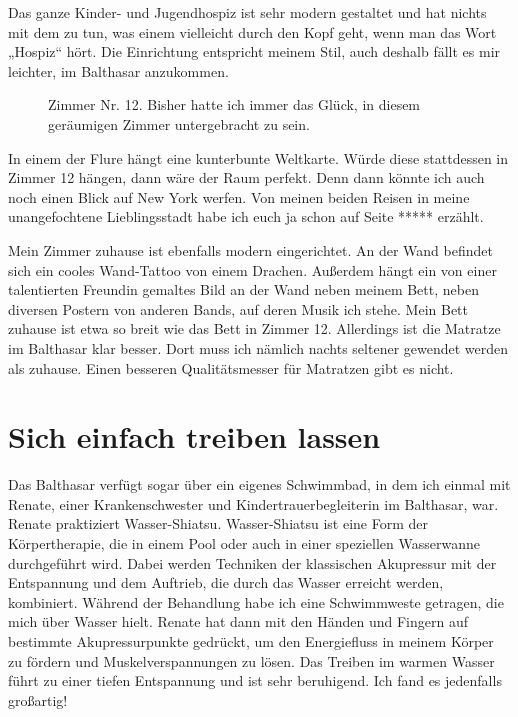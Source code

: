 \documentclass[fontsize=14pt,a4paper,headinclude,DIV=calc,automark]{scrbook}
\begin{document}
Das ganze Kinder- und Jugendhospiz ist sehr modern gestaltet und hat nichts mit dem zu tun, was einem vielleicht durch den Kopf geht, wenn man das Wort „Hospiz“ hört. Die Einrichtung entspricht meinem Stil, auch deshalb fällt es mir leichter, im Balthasar anzukommen.

\setlength{\fboxsep}{0pt}    %
\setlength{\fboxrule}{0.2pt} %
\begin{figure}[ht]
    \raggedright
    \caption{Zimmer Nr. 12. Bisher hatte ich immer das Glück, in diesem geräumigen Zimmer untergebracht zu sein.}
    \label{fig:zimmer-12}
\end{figure}

In einem der Flure hängt eine kunterbunte Weltkarte. Würde diese stattdessen in Zimmer 12 hängen, dann wäre der Raum perfekt. Denn dann könnte ich auch noch einen Blick auf New York werfen. Von meinen beiden Reisen in meine unangefochtene Lieblingsstadt habe ich euch ja schon auf Seite ***** erzählt.

Mein Zimmer zuhause ist ebenfalls modern eingerichtet. An der Wand befindet sich ein cooles Wand-Tattoo von einem Drachen. Außerdem hängt ein von einer talentierten Freundin gemaltes Bild an der Wand neben meinem Bett, neben diversen Postern von anderen Bands, auf deren Musik ich stehe. Mein Bett zuhause ist etwa so breit wie das Bett in Zimmer 12. Allerdings ist die Matratze im Balthasar klar besser. Dort muss ich nämlich nachts seltener gewendet werden als zuhause. Einen besseren Qualitätsmesser für Matratzen gibt es nicht.

\section{Sich einfach treiben lassen}

Das Balthasar verfügt sogar über ein eigenes Schwimmbad, in dem ich einmal mit Renate, einer Krankenschwester und Kindertrauerbegleiterin im Balthasar, war. Renate praktiziert Wasser-Shiatsu. Wasser-Shiatsu ist eine Form der Körpertherapie, die in einem Pool oder auch in einer speziellen Wasserwanne durchgeführt wird. Dabei werden Techniken der klassischen Akupressur mit der Entspannung und dem Auftrieb, die durch das Wasser erreicht werden, kombiniert. Während der Behandlung habe ich eine Schwimmweste getragen, die mich über Wasser hielt. Renate hat dann mit den Händen und Fingern auf bestimmte Akupressurpunkte gedrückt, um den Energiefluss in meinem Körper zu fördern und Muskelverspannungen zu lösen. Das Treiben im warmen Wasser führt zu einer tiefen Entspannung und ist sehr beruhigend. Ich fand es jedenfalls großartig!
\end{document}

